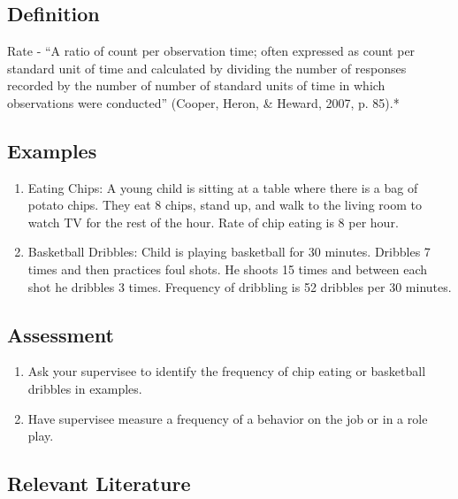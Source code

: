 \section{\fouraTwo{}}
%
%
\subsection{Definition}
Rate - ``A ratio of count per observation time; often expressed as count per standard unit of time and calculated by dividing the number of responses recorded by the number of number of standard units of time in which observations were conducted'' (Cooper, Heron, \& Heward, 2007, p. 85).*
%
\subsection{Examples}
\begin{enumerate}
\item    Eating Chips: A young child is sitting at a table where there is a bag of potato chips. They eat 8 chips, stand up, and walk to the living room to watch TV for the rest of the hour. Rate of chip eating is 8 per hour.
\item Basketball Dribbles: Child is playing basketball for 30 minutes. Dribbles 7 times and then practices foul shots. He shoots 15 times and between each shot he dribbles 3 times. Frequency of dribbling is 52 dribbles per 30 minutes.
\end{enumerate}

\subsection{Assessment} 
\begin{enumerate}
\item Ask your supervisee to identify the frequency of chip eating or basketball dribbles in examples.
\item Have supervisee measure a frequency of a behavior on the job or in a role play.
\end{enumerate}
%
\subsection{Relevant Literature}
\begin{refsection}
\nocite{test,alang2017police,clayton2018black}
\printbibliography[heading=none]
\end{refsection}

